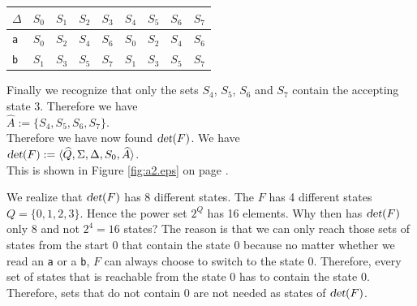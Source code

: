 \begin{center}
\begin{tabular}[t]{|l||c|c|c|c|c|c|c|c|}
\hline
$\Delta$ & $S_0$ & $S_1$ & $S_2$ & $S_3$ & $S_4$ & $S_5$ & $S_6$ & $S_7$ \\
\hline
\hline
\texttt{a} & $S_0$ & $S_2$ & $S_4$ & $S_6$ & $S_0$ & $S_2$ & $S_4$ & $S_6$ \\
\hline
\texttt{b} & $S_1$ & $S_3$ & $S_5$ & $S_7$ & $S_1$ & $S_3$ & $S_5$ & $S_7$ \\
\hline
\end{tabular}
\end{center}
Finally we recognize that only the sets  $S_4$, $S_5$, $S_6$ and $S_7$ contain the accepting state
 $3$.  Therefore we have
\\[0.2cm]
\hspace*{1.3cm}
$\widehat{A} := \{ S_4, S_5, S_6, S_7 \}$.
\\[0.2cm]
Therefore we have now found $\textsl{det}(F)$. We have
\\[0.2cm]
\hspace*{1.3cm}
$\textsl{det}(F) := \langle \widehat{Q}, \Sigma, \Delta, S_0, \widehat{A}\rangle$.
\\[0.2cm]
This  is shown in Figure \ref{fig:a2.eps} on page \pageref{fig:a2.eps}.

We realize that $\textsl{det}(F)$ has 8 different states. 
The  $F$ has 4 different states
 $Q = \{ 0, 1, 2, 3 \}$.  Hence the power set $2^Q$ has 16 elements.
Why then has  $\textsl{det}(F)$ only 8 and not $2^4 = 16$ states?
The reason is that we can only reach those sets of states from the start $0$
that contain the state $0$ because no matter whether we read an \texttt{a} or a \texttt{b},
 $F$ can always choose to switch to the state $0$.  Therefore, every set of states that is
reachable from the state $0$ has to contain the state $0$.  Therefore,
sets that do not contain $0$ are not needed as states of $\textsl{det}(F)$.

